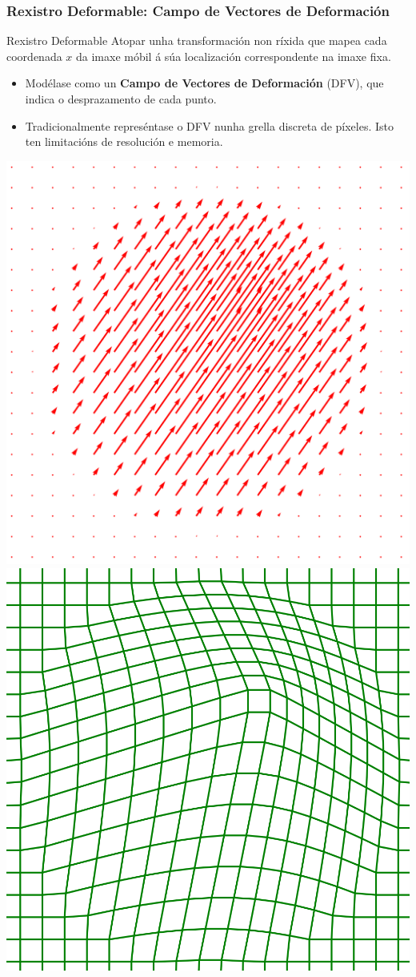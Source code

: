 \documentclass[xcolor=dvipsnames]{beamer}
\begin{document}
\begin{frame}
    \frametitle{Rexistro Deformable: Campo de Vectores de Deformación}
        
        \begin{block}{Rexistro Deformable}
            Atopar unha transformación non ríxida que mapea cada coordenada $x$ da imaxe móbil á súa localización correspondente na imaxe fixa.
            \begin{itemize}
                \item Modélase como un \textbf{Campo de Vectores de Deformación} (DFV), que indica o desprazamento de cada punto.
                \item Tradicionalmente represéntase o DFV nunha grella discreta de píxeles. Isto ten limitacións de resolución e memoria.
            \end{itemize}
        \end{block}

        \begin{minipage}{\textwidth}
            \centering
            \includegraphics[width=0.22\linewidth]{../imaxes/dfv_arrows.png}
            \hspace{2cm}
            \includegraphics[width=0.22\linewidth]{../imaxes/dfv_grid.png}
        \end{minipage}
    \end{frame}
\end{document}
